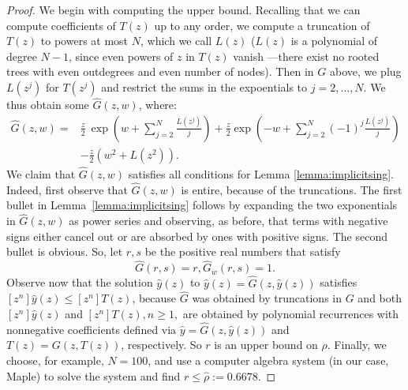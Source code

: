 \documentclass{amsart}
\theoremstyle{plain}
\newcommand{\nicetrees}{T}
\newcommand{\UG}{\hat{G}}
\begin{document}
\begin{proof}
We begin with computing the upper bound.   Recalling that we can compute coefficients of $T(z)$ up to any order, we compute a truncation of $T(z)$ to powers at most  $N$, which we call $L(z)$ ($L(z)$ is a polynomial of degree $N-1$, since even powers of $z$ in $T(z)$ vanish ---there exist no rooted trees with even outdegrees and even number of nodes). Then in $G$ above, we plug  $L(z^j)$ for $T(z^j)$  and restrict the sums in the expoentials to $j=2, \ldots, N$. We thus obtain some  $\UG(z,w)$, where:
\begin{align}\label{eq:UG}
\nonumber \UG(z,w) =   &\frac{z}{2} 
\ \exp\left( w + \sum\limits_{j =2}^{N} \frac{L(z^j)}{j}\right) 
+ \frac{z}{2}\exp\left(-w + \sum\limits_{j =2}^{N} (-1)^j \frac{L(z^j)}{j}\right) \\ &
- \frac{z}{2}\left({w^2}
+ {L(z^2)} \right).
\end{align}
We claim that $\UG(z,w)$ satisfies  all conditions for Lemma \ref{lemma:implicitsing}.  Indeed, first  observe that 
$\UG(z,w)$  is  entire,  because of the truncations. The first bullet in Lemma~\ref{lemma:implicitsing} follows by expanding the two exponentials in $\UG(z,w)$ as power series and observing, as before,  that terms with negative signs either cancel out or are absorbed  by ones with positive signs. The second  bullet  is obvious.  So, let $r,s$ be the positive real numbers that satisfy 
$$\UG(r,s)=r,\UG_w(r,s)=1.$$
 Observe now that  the solution $\hat{y}(z)$ to $\hat{y}(z) = \UG(z,\hat{y}(z))$
satisfies $[z^n] \hat{y}(z) \leq [z^n] \nicetrees(z)$, because  $\UG$ was obtained by truncations in $G$ and both  $[z^n] \hat{y}(z)$ and  $[z^n] \nicetrees(z), n\geq 1,$ are  obtained by polynomial recurrences with nonnegative coefficients defined via $\hat{y} = \UG(z,\hat{y}(z))$ and $T(z) = G(z, T(z))$, respectively. So $r$ is an upper bound on $\rho$. Finally, we choose, for example,  $N=100$, and  use a computer algebra system (in our case, Maple) to solve the system and find $r \leq \hat{\rho} := 0.6678$.


\end{proof}
\end{document}

